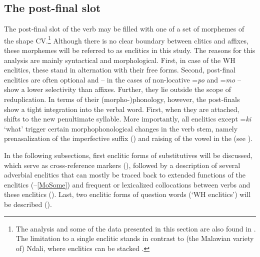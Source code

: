 \subsection{The post-final slot}
\label{PostfinalClitics}
The post-final slot of the verb may be filled with one of a set of morphemes of the shape CV.\footnote{The analysis and some of the data presented in this section are also found in \citet{PersohnB2017a}. The limitation to a single enclitic stands in contrast to (the Malawian variety of) Ndali, where enclitics can be stacked \citep[92]{BotneR2008}.} Although there is no clear boundary between clitics and affixes, these morphemes will be referred to as enclitics in this study. The reasons for this analysis are mainly syntactical and morphological. First, in case of the WH enclitics, these stand in alternation with their free forms. Second, post-final enclitics are often optional and -- in the cases of non-locative =\textit{po} and \mbox{=\textit{mo}} -- show a lower selectivity than affixes. Further, they lie outside the scope of  reduplication. In terms of their (morpho-)phonology, however, the post-finals show a tight integration into the verbal word. First, when they are attached,  shifts to the new penultimate syllable. More importantly, all enclitics except =\textit{ki} `what' trigger certain morphophonological changes in the verb stem, namely prenasalization of the imperfective suffix () and raising of the vowel in the  (see ).

In the following subsections, first enclitic forms of  substitutives will be discussed, which serve as  cross-reference markers  (), followed by a description of several adverbial enclitics that can mostly be traced back to extended functions of the  enclitics (--\ref{MoSome}) and frequent or lexicalized collocations between verbs and these enclitics (). Last, two enclitic forms of question words (\lq WH enclitics') will be described ().

